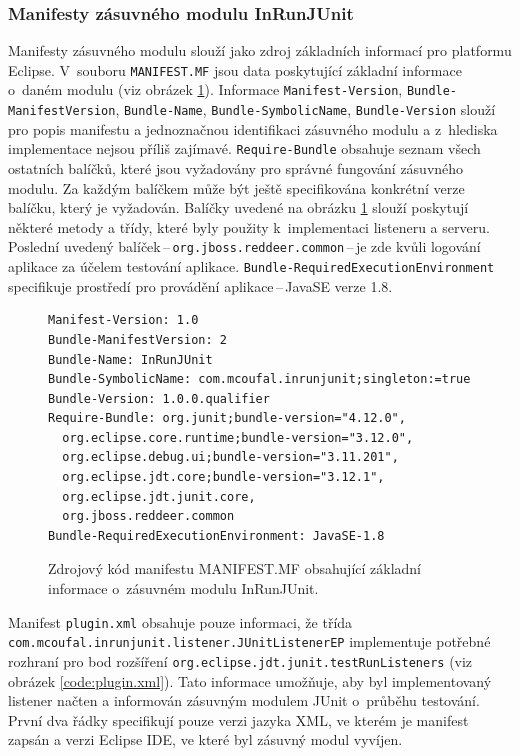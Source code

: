       \subsubsection{Manifesty zásuvného modulu InRunJUnit}
	Manifesty zásuvného modulu slouží jako zdroj základních informací pro platformu Eclipse. V~souboru \texttt{MANIFEST.MF} jsou data poskytující základní informace o~daném modulu (viz obrázek \ref{code:manifest.mf}). Informace \texttt{Manifest-Version}, \texttt{Bundle-ManifestVersion}, \texttt{Bundle-Name}, \texttt{Bundle-SymbolicName}, \texttt{Bundle-Version} slouží pro popis manifestu a jednoznačnou identifikaci zásuvného modulu a z~hlediska implementace nejsou příliš zajímavé. \texttt{Require-Bundle} obsahuje seznam všech ostatních balíčků, které jsou vyžadovány pro správné fungování zásuvného modulu. Za každým balíčkem může být ještě specifikována konkrétní verze balíčku, který je vyžadován. Balíčky uvedené na obrázku \ref{code:manifest.mf} slouží poskytují některé metody a třídy, které byly použity k~implementaci listeneru a serveru. Poslední uvedený balíček\,--\,\texttt{org.jboss.reddeer.common}\,--\,je zde kvůli logování aplikace za účelem testování aplikace. \texttt{Bundle-RequiredExecutionEnvironment} specifikuje prostředí pro provádění aplikace\,--\,JavaSE verze 1.8. 
	
	\lstset{language=}
	\begin{figure}
	  \begin{lstlisting}[frame=single]
Manifest-Version: 1.0
Bundle-ManifestVersion: 2
Bundle-Name: InRunJUnit
Bundle-SymbolicName: com.mcoufal.inrunjunit;singleton:=true
Bundle-Version: 1.0.0.qualifier
Require-Bundle: org.junit;bundle-version="4.12.0",
  org.eclipse.core.runtime;bundle-version="3.12.0",
  org.eclipse.debug.ui;bundle-version="3.11.201",
  org.eclipse.jdt.core;bundle-version="3.12.1",
  org.eclipse.jdt.junit.core,
  org.jboss.reddeer.common
Bundle-RequiredExecutionEnvironment: JavaSE-1.8
	  \end{lstlisting}
	  \caption{Zdrojový kód manifestu MANIFEST.MF obsahující základní informace o~zásuvném modulu InRunJUnit.}
	  \label{code:manifest.mf}
	\end{figure}
	
	Manifest \texttt{plugin.xml} obsahuje pouze informaci, že třída \texttt{com.\-mcoufal.\-inrunjunit.\-listener.\-JUnitListenerEP} implementuje potřebné rozhraní pro bod rozšíření \texttt{org.\-eclipse.\-jdt.\-junit.\-testRunListeners} (viz obrázek \ref{code:plugin.xml}). Tato informace umožňuje, aby byl implementovaný listener načten a informován zásuvným modulem JUnit o~průběhu testování. První dva řádky specifikují pouze verzi jazyka XML, ve kterém je manifest zapsán a verzi Eclipse IDE, ve které byl zásuvný modul vyvíjen.  

